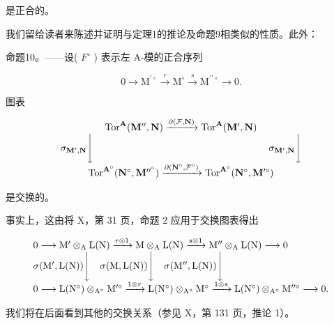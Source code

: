 是正合的。

我们留给读者来陈述并证明与定理1的推论及命题9相类似的性质。此外：

命题10。——设( \(F^{\circ}\) ) 表示左 A-模的正合序列

\[
0 \rightarrow \mathrm{M} ^ {\prime \circ} \xrightarrow {r} \mathrm{M} ^ {\circ} \xrightarrow {s} \mathrm{M} ^ {\prime \prime \circ} \rightarrow 0.
\]

图表

\[
\begin{array}{c} \operatorname{Tor} ^ {\mathbf {A}} (\mathbf {M} ^ {\prime \prime}, \mathbf {N}) \xrightarrow {\partial (\mathcal {F} , \mathbf {N})} \operatorname{Tor} ^ {\mathbf {A}} (\mathbf {M} ^ {\prime}, \mathbf {N}) \\ \sigma_ {\mathbf {M} ^ {\prime}, \mathbf {N}} \Biggl \downarrow \qquad \qquad \qquad \qquad \qquad \qquad \qquad \qquad \qquad \sigma_ {\mathbf {M} ^ {\prime}, \mathbf {N}} \Biggl \downarrow \\ \operatorname{Tor} ^ {\mathbf {A} ^ {\circ}} (\mathbf {N} ^ {\circ}, \mathbf {M} ^ {\prime \prime^ {\circ}}) \xrightarrow {\partial (\mathbf {N} ^ {\circ} , \mathcal {F} ^ {\circ})} \operatorname{Tor} ^ {\mathbf {A} ^ {\circ}} (\mathbf {N} ^ {\circ}, \mathbf {M} ^ {\prime \circ}) \end{array}
\]

是交换的。

事实上，这由将 X，第 31 页，命题 2 应用于交换图表得出

\[
\begin{array}{l} 0 \longrightarrow \mathrm{M} ^ {\prime} \otimes_ {\mathrm{A}} \mathrm{L} (\mathrm{N}) \xrightarrow {r \otimes 1} \mathrm{M} \otimes_ {\mathrm{A}} \mathrm{L} (\mathrm{N}) \xrightarrow {s \otimes 1} \mathrm{M} ^ {\prime \prime} \otimes_ {\mathrm{A}} \mathrm{L} (\mathrm{N}) \longrightarrow 0 \\ \sigma (\mathrm{M} ^ {\prime}, \mathrm{L} (\mathrm{N})) \Biggl \downarrow \quad \sigma (\mathrm{M}, \mathrm{L} (\mathrm{N})) \Biggl \downarrow \quad \sigma (\mathrm{M} ^ {\prime \prime}, \mathrm{L} (\mathrm{N})) \Biggl \downarrow \\ 0 \longrightarrow \mathrm{L} (\mathrm{N} ^ {\circ}) \otimes_ {\mathrm{A} ^ {\circ}} \mathrm{M} ^ {\prime \circ} \xrightarrow {1 \otimes r} \mathrm{L} (\mathrm{N} ^ {\circ}) \otimes_ {\mathrm{A} ^ {\circ}} \mathrm{M} ^ {\circ} \xrightarrow {1 \otimes s} \mathrm{L} (\mathrm{N} ^ {\circ}) \otimes_ {\mathrm{A} ^ {\circ}} \mathrm{M} ^ {\prime \prime \circ} \longrightarrow 0. \end{array}
\]

我们将在后面看到其他的交换关系（参见 X，第 131 页，推论 1）。

